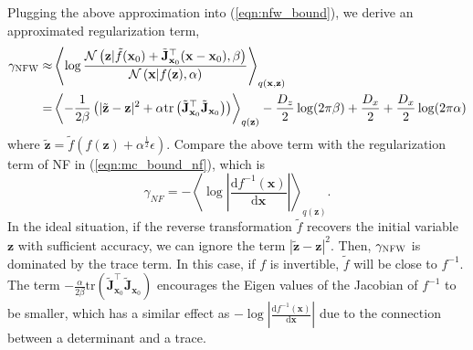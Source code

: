 \documentclass[twoside]{article}
\newcommand{\xV}{\mathbf{x}}
\newcommand{\zV}{\mathbf{z}}
\newcommand{\expectationDist}[2]{\left\langle #1 \right\rangle _{#2}}
\newcommand{\diff}{\text{d}}
\newcommand{\J}{\mathbf{J}}
\newcommand{\gaussianDist}[3]{\mathcal{N}\left(#1|#2,#3\right)}
\newcommand{\tr}[1]{\text{tr}\left(#1\right)}
\newcommand{\acr}[1]{\textsc{#1}\xspace}
\newcommand{\us}{\acr{NFW}}
\begin{document}
Plugging the above approximation into (\ref{eqn:nfw_bound}), we derive an approximated regularization term,
 \begin{align*}
\gamma_{\text{\us}} \approx& \expectationDist{\log \frac{\gaussianDist{\zV}{\tilde{f}(\xV_0) +  \tilde{\J}_{\xV_0}^\top(\xV - \xV_0)}{\beta}}{\gaussianDist{\xV}{f(\zV)}{\alpha}}}{q(\xV,\zV)} \\
=& \expectationDist{-\frac{1}{2\beta}\left( |\tilde{\zV} - \zV|^2 + \alpha \tr{\tilde{\J}_{\xV_0}^\top \tilde{\J}_{\xV_0}} \right)}{q(\zV)} - \frac{D_z}{2}\log (2\pi\beta) +\frac{D_x}{2} + \frac{D_x}{2}\log (2\pi\alpha)
\end{align*}
where $\tilde{\zV} = \tilde{f}( f(\zV) + \alpha^{\frac{1}{2}} \epsilon)$.
Compare the above term with the regularization term of NF in (\ref{eqn:mc_bound_nf}), which is
$$
\gamma_{NF} = -\expectationDist{\log \left| \frac{\diff f^{-1}(\xV)}{\diff \xV}\right|}{q(\zV)}.
$$
In the ideal situation, if the reverse transformation $\tilde{f}$ recovers the initial variable $\zV$ with sufficient accuracy, we can ignore the term $|\tilde{\zV} - \zV|^2$. Then, $\gamma_{\text{\us}}$ is dominated by the trace term.  In this case, if $f$ is invertible, $\tilde{f}$ will be close to $f^{-1}$. The term $-\frac{\alpha}{2\beta} \tr{\tilde{\J}_{\xV_0}^\top \tilde{\J}_{\xV_0}}$ encourages the Eigen values of the Jacobian of $f^{-1}$ to be smaller, which has a similar effect as $-\log \left| \frac{\diff f^{-1}(\xV)}{\diff \xV}\right|$ due to the connection between a determinant and a trace.
\end{document}
